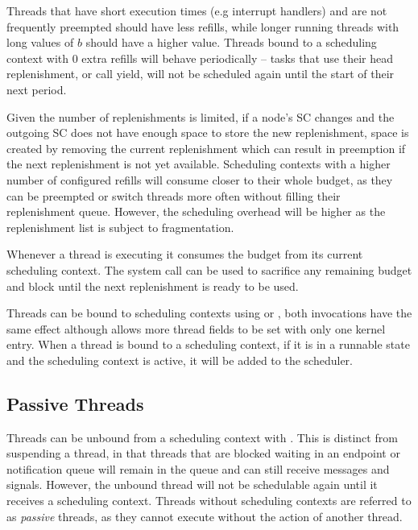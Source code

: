 Threads that have short execution times (e.g interrupt handlers) and are not frequently preempted
should have less refills, while longer running threads with long values of $b$ should have a higher
value. Threads bound to a scheduling context with 0 extra refills will behave periodically -- tasks
that use their head replenishment, or call yield, will not be scheduled again until the start of
their next period.

Given the number of replenishments is limited, if a node's SC changes and the outgoing SC does not
have enough space to store the new replenishment, space is created by removing the current
replenishment which can result in preemption if the next replenishment is not yet available.
Scheduling contexts with a higher number of configured refills will consume closer
to their whole budget, as they can be preempted or switch threads more often without filling their
replenishment queue. However, the scheduling overhead will be higher as the replenishment list is
subject to fragmentation.

Whenever a thread is executing it consumes the budget from its current scheduling context.  The
system call  can be used to sacrifice any remaining budget and
block until the next replenishment is ready to be used.

Threads can be bound to scheduling contexts using  or
, both invocations have the same effect
although  allows more thread fields to be set with only
one kernel entry.  When a thread is bound to a scheduling context, if it is in a runnable state and
the scheduling context is active, it will be added to the scheduler.

\subsection{Passive Threads} \label{sec:passive}

Threads can be unbound from a scheduling context with
.  This is distinct from
suspending a thread, in that threads that are blocked waiting in an endpoint or notification queue
will remain in the queue and can still receive messages and signals.  However, the unbound thread
will not be schedulable again until it receives a scheduling context.  Threads without scheduling
contexts are referred to as \emph{passive} threads, as they cannot execute without the action of
another thread.

